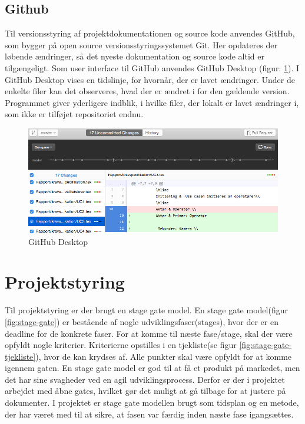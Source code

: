 \subsection{Github}
\label{subsec:github}
Til versionsstyring af projektdokumentationen og source kode anvendes GitHub, som bygger på open source versionsstyringssystemet Git. Her opdateres der løbende ændringer, så det nyeste dokumentation og source kode altid er tilgængeligt. 
Som user interface til GitHub anvendes GitHub Desktop (figur: \ref{fig:git}). I GitHub Desktop vises en tidslinje, for hvornår, der er lavet ændringer. Under de enkelte filer kan det observeres, hvad der er ændret i for den gældende version. Programmet giver yderligere indblik, i hvilke filer, der lokalt er lavet ændringer i, som ikke er tilføjet repositoriet endnu.
\begin{figure}[H]
	\centering
	\includegraphics[width=1\textwidth]{billeder/github.png}
	\caption{GitHub Desktop}
	\label{fig:git}
\end{figure}
\newpage

\section{Projektstyring} 
Til projektstyring er der brugt en stage gate model. En stage gate model(figur \ref{fig:stage-gate}) er bestående af nogle udviklingsfaser(stages), hvor der er en deadline for de konkrete faser. For at komme til næste fase/stage, skal der være opfyldt nogle kriterier. Kriterierne opstilles i en tjekliste(se figur \ref{fig:stage-gate-tjekliste}), hvor de kan krydses af. Alle punkter skal være opfyldt for at komme igennem gaten. En stage gate model er god til at få et produkt på markedet, men det har sine svagheder ved en agil udviklingsprocess. Derfor er der i projektet arbejdet med åbne gates, hvilket gør det muligt at gå tilbage for at justere på dokumenter. I projektet er stage gate modellen brugt som tidsplan og en metode, der har været med til at sikre, at fasen var færdig inden næste fase igangsættes. 

